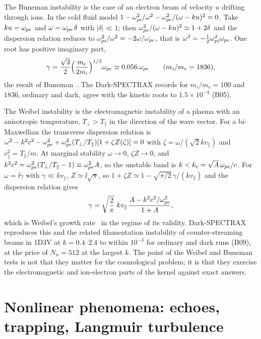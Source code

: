 The Buneman instability is the case of an electron beam of velocity $u$ drifting through ions. In the cold fluid model $1-\omega_{pi}^2/\omega^2-\omega_{pe}^2/(\omega-ku)^2=0$. Take $ku=\omega_{pe}$ and $\omega=\omega_{pe}\,\delta$ with $|\delta|\ll1$; then $\omega_{pe}^2/(\omega-ku)^2\simeq1+2\delta$ and the dispersion relation reduces to $\omega_{pi}^2/\omega^2=-2\omega/\omega_{pe}$, that is $\omega^3=-\tfrac12\omega_{pi}^2\omega_{pe}$. One root has positive imaginary part,
\begin{equation}
\gamma=\frac{\sqrt3}{2}\Big(\frac{m_e}{2m_i}\Big)^{1/3}\omega_{pe}\simeq0.056\,\omega_{pe}\qquad(m_i/m_e=1836),
\end{equation}
the result of Buneman~\citep{Buneman1958}. The Dark-SPECTRAX records for $m_i/m_e=100$ and $1836$, ordinary and dark, agree with the kinetic roots to $1.5\times10^{-4}$ (B05).

The Weibel instability is the electromagnetic instability of a plasma with an anisotropic temperature, $T_\perp>T_\parallel$ in the direction of the wave vector. For a bi-Maxwellian the transverse dispersion relation is $\omega^2-k^2c^2-\omega_{pe}^2+\omega_{pe}^2(T_\perp/T_\parallel)[1+\zeta Z(\zeta)]=0$ with $\zeta=\omega/(\sqrt2k v_\parallel)$ and $v_\parallel^2=T_\parallel/m$. At marginal stability $\omega\to0$, $\zeta Z\to0$, and $k^2c^2=\omega_{pe}^2(T_\perp/T_\parallel-1)\equiv\omega_{pe}^2A$, so the unstable band is $k<k_c=\sqrt A\,\omega_{pe}/c$. For $\omega=\ii\gamma$ with $\gamma\ll kv_\parallel$, $Z\simeq\ii\sqrt\pi$, so $1+\zeta Z\simeq1-\sqrt{\pi/2}\,\gamma/(kv_\parallel)$ and the dispersion relation gives
\begin{equation}
\gamma=\sqrt{\frac{2}{\pi}}\;kv_\parallel\,\frac{A-k^2c^2/\omega_{pe}^2}{1+A} ,
\end{equation}
which is Weibel's growth rate~\citep{Weibel1959} in the regime of its validity. Dark-SPECTRAX reproduces this and the related filamentation instability of counter-streaming beams in 1D3V at $k=0.4$--$2.4$ to within $10^{-3}$ for ordinary and dark runs (B09), at the price of $N_n=512$ at the largest $k$. The point of the Weibel and Buneman tests is not that they matter for the cosmological problem; it is that they exercise the electromagnetic and ion-electron parts of the kernel against exact answers.

\section{Nonlinear phenomena: echoes, trapping, Langmuir turbulence}\label{sec:nonlinear}

